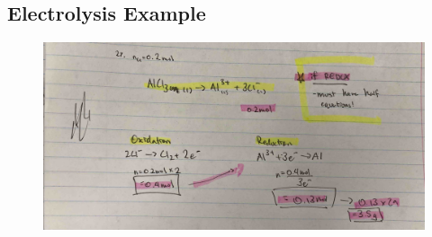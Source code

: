 \documentclass{article}
\begin{document}
\begin{itemize}
\subsection{Electrolysis Example}
\begin{figure}
\centering
\includegraphics[width=\textwidth]{5.5fig1.JPG}
\end{figure}
\end{itemize}
\end{document}
